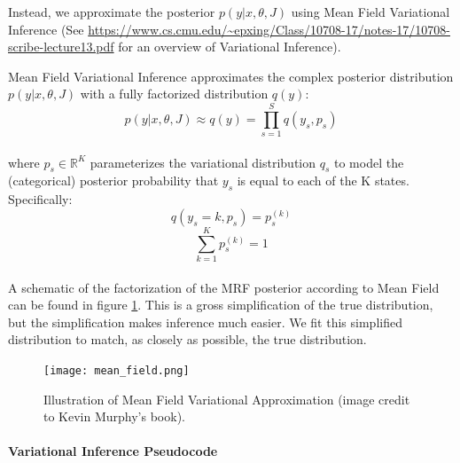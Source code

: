 \documentclass[11pt]{article}
\begin{document}
Instead, we approximate the posterior $p(y|x,\theta,J)$ using Mean Field Variational Inference (See {\scriptsize \url{https://www.cs.cmu.edu/~epxing/Class/10708-17/notes-17/10708-scribe-lecture13.pdf}} for an overview of Variational Inference).

Mean Field Variational Inference approximates the complex posterior distribution $p(y|x,\theta,J)$ with a fully factorized distribution $q(y)$:
\begin{equation}\label{eq:vi_1}
    p(y|x,\theta,J) \approx q(y) = \prod_{s=1}^S q(y_s,p_s)
\end{equation}
\\
where $p_s\in \mathbb{R}^K$ parameterizes the variational distribution $q_s$ to model the (categorical) posterior probability that $y_s$ is equal to each of the K states. Specifically:
\begin{equation}
    q(y_s=k,p_s)=p_s^{(k)}
\end{equation}
\begin{equation}
    \sum_{k=1}^K p_s^{(k)} =1
\end{equation}\\
 A schematic of the factorization of the MRF posterior according to Mean Field can be found in figure \ref{fig:mean-field}. This is a gross simplification of the true distribution, but the simplification makes inference much easier. We fit this simplified distribution to match, as closely as possible, the true distribution.

\begin{figure}\centering
    \texttt{[image: mean\_field.png]}
    \caption{Illustration of Mean Field Variational Approximation (image credit to Kevin Murphy's
      book).}
    \label{fig:mean-field}
\end{figure}

\paragraph{Variational Inference Pseudocode}
\end{document}
